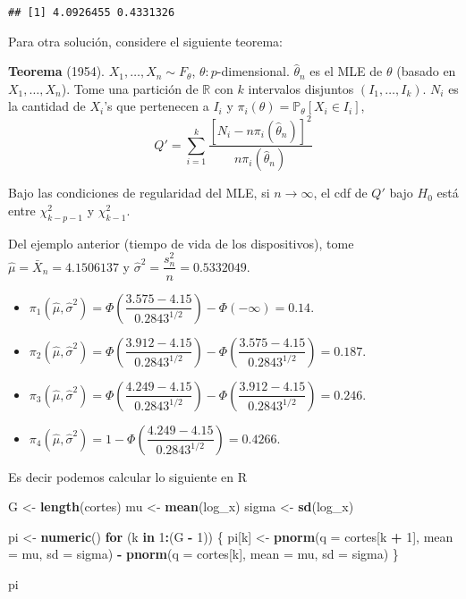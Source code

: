 \documentclass[
  12pt,
]{book}
\newenvironment{Shaded}{\begin{snugshade}}{\end{snugshade}}
\newcommand{\ControlFlowTok}[1]{\textcolor[rgb]{0.13,0.29,0.53}{\textbf{#1}}}
\newcommand{\DataTypeTok}[1]{\textcolor[rgb]{0.13,0.29,0.53}{#1}}
\newcommand{\DecValTok}[1]{\textcolor[rgb]{0.00,0.00,0.81}{#1}}
\newcommand{\KeywordTok}[1]{\textcolor[rgb]{0.13,0.29,0.53}{\textbf{#1}}}
\newcommand{\NormalTok}[1]{#1}
\newcommand{\OperatorTok}[1]{\textcolor[rgb]{0.81,0.36,0.00}{\textbf{#1}}}
\newcommand{\StringTok}[1]{\textcolor[rgb]{0.31,0.60,0.02}{#1}}
\begin{document}
\begin{verbatim}
## [1] 4.0926455 0.4331326
\end{verbatim}

Para otra solución, considere el siguiente teorema:

\textbf{Teorema} (1954). \(X_1,\dots, X_n\sim F_\theta\), \(\theta: p\)-dimensional.
\(\hat\theta_n\) es el MLE de \(\theta\) (basado en \(X_1,\dots, X_n\)). Tome una
partición de \(\mathbb R\) con \(k\) intervalos disjuntos \((I_1,\dots,I_k)\). \(N_i\)
es la cantidad de \(X_i\)'s que pertenecen a \(I_i\) y \(\pi_i(\theta)=\mathbb P_\theta[X_i\in I_i]\), \[Q' =
\sum_{i=1}^k\dfrac{[N_i-n\pi_i(\hat\theta_n)]^2}{n\pi_i(\hat\theta_n)}\]

Bajo las condiciones de regularidad del MLE, si \(n\to\infty\), el cdf de \(Q'\) bajo \(H_0\) está entre \(\chi^2_{k-p-1}\) y \(\chi^2_{k-1}\).

Del ejemplo anterior (tiempo de vida de los dispositivos), tome
\(\hat\mu = \bar X_n =4.1506137\) y
\(\hat\sigma^2 = \dfrac{s_n^2}{n} = 0.5332049\).

\begin{itemize}
\item
  \(\pi_1(\hat\mu,\hat\sigma^2) = \Phi\left(\dfrac{3.575-4.15}{0.2843^{1/2}}\right)-\Phi(-\infty) = 0.14\).
\item
  \(\pi_2(\hat\mu,\hat\sigma^2) = \Phi\left(\dfrac{3.912-4.15}{0.2843^{1/2}}\right) - \Phi\left(\dfrac{3.575-4.15}{0.2843^{1/2}}\right) = 0.187\).
\item
  \(\pi_3(\hat\mu,\hat\sigma^2) = \Phi\left(\dfrac{4.249-4.15}{0.2843^{1/2}}\right) - \Phi\left(\dfrac{3.912-4.15}{0.2843^{1/2}}\right) = 0.246\).
\item
  \(\pi_4(\hat\mu,\hat\sigma^2) = 1 - \Phi\left(\dfrac{4.249-4.15}{0.2843^{1/2}}\right) = 0.4266\).
\end{itemize}

Es decir podemos calcular lo siguiente en R

\begin{Shaded}
\begin{Highlighting}[]
\NormalTok{G \textless{}{-}}\StringTok{ }\KeywordTok{length}\NormalTok{(cortes)}
\NormalTok{mu \textless{}{-}}\StringTok{ }\KeywordTok{mean}\NormalTok{(log\_x)}
\NormalTok{sigma \textless{}{-}}\StringTok{ }\KeywordTok{sd}\NormalTok{(log\_x)}

\NormalTok{pi \textless{}{-}}\StringTok{ }\KeywordTok{numeric}\NormalTok{()}
\ControlFlowTok{for}\NormalTok{ (k }\ControlFlowTok{in} \DecValTok{1}\OperatorTok{:}\NormalTok{(G }\OperatorTok{{-}}\StringTok{ }\DecValTok{1}\NormalTok{)) \{}
\NormalTok{  pi[k] \textless{}{-}}\StringTok{ }\KeywordTok{pnorm}\NormalTok{(}\DataTypeTok{q =}\NormalTok{ cortes[k }\OperatorTok{+}\StringTok{ }\DecValTok{1}\NormalTok{], }\DataTypeTok{mean =}\NormalTok{ mu, }\DataTypeTok{sd =}\NormalTok{ sigma) }\OperatorTok{{-}}
\StringTok{    }\KeywordTok{pnorm}\NormalTok{(}\DataTypeTok{q =}\NormalTok{ cortes[k], }\DataTypeTok{mean =}\NormalTok{ mu, }\DataTypeTok{sd =}\NormalTok{ sigma)}
\NormalTok{\}}

\NormalTok{pi}
\end{Highlighting}
\end{Shaded}
\end{document}
